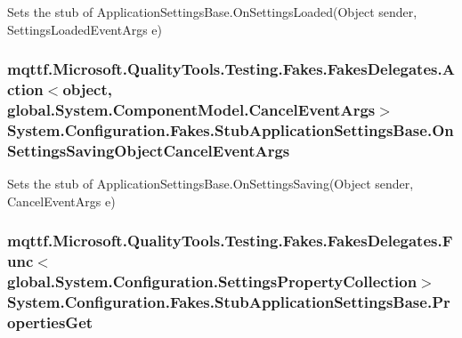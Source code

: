 Sets the stub of Application\-Settings\-Base.\-On\-Settings\-Loaded(\-Object sender, Settings\-Loaded\-Event\-Args e)

\hypertarget{class_system_1_1_configuration_1_1_fakes_1_1_stub_application_settings_base_ad4bd71e6624c045af8664f4ae6c280a0}{
\subsubsection[{On\-Settings\-Saving\-Object\-Cancel\-Event\-Args}]{\setlength{\rightskip}{0pt plus 5cm}mqttf.\-Microsoft.\-Quality\-Tools.\-Testing.\-Fakes.\-Fakes\-Delegates.\-Action$<$object, global.\-System.\-Component\-Model.\-Cancel\-Event\-Args$>$ System.\-Configuration.\-Fakes.\-Stub\-Application\-Settings\-Base.\-On\-Settings\-Saving\-Object\-Cancel\-Event\-Args}}\label{class_system_1_1_configuration_1_1_fakes_1_1_stub_application_settings_base_ad4bd71e6624c045af8664f4ae6c280a0}


Sets the stub of Application\-Settings\-Base.\-On\-Settings\-Saving(\-Object sender, Cancel\-Event\-Args e)

\hypertarget{class_system_1_1_configuration_1_1_fakes_1_1_stub_application_settings_base_ae3ca7d2960b744526bc0917bcc247a6a}{
\subsubsection[{Properties\-Get}]{\setlength{\rightskip}{0pt plus 5cm}mqttf.\-Microsoft.\-Quality\-Tools.\-Testing.\-Fakes.\-Fakes\-Delegates.\-Func$<$global.\-System.\-Configuration.\-Settings\-Property\-Collection$>$ System.\-Configuration.\-Fakes.\-Stub\-Application\-Settings\-Base.\-Properties\-Get}}\label{class_system_1_1_configuration_1_1_fakes_1_1_stub_application_settings_base_ae3ca7d2960b744526bc0917bcc247a6a}


